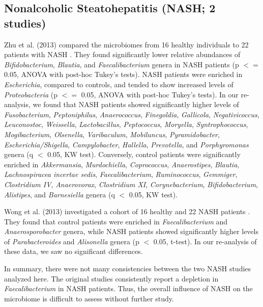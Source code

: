 {\subsection*{Nonalcoholic Steatohepatitis (NASH; 2 studies)}

Zhu et al. (2013) compared the microbiomes from 16 healthy individuals to 22 patients with NASH \cite{nash-baker}.
They found significantly lower relative abundances of \textit{Bifidobacterium}, \textit{Blautia}, and \textit{Faecalibacterium} genera in NASH patients (p $<=$ 0.05, ANOVA with post-hoc Tukey's tests).
NASH patients were enriched in \textit{Escherichia}, compared to controls, and tended to show increased levels of \textit{Proteobacteria} (p $<=$ 0.05, ANOVA with post-hoc Tukey's tests).
In our re-analysis, we found that NASH patients showed significantly higher levels of \textit{Fusobacterium}, \textit{Peptoniphilus}, \textit{Anaerococcus}, \textit{Finegoldia}, \textit{Gallicola}, \textit{Negativicoccus}, \textit{Leuconostoc}, \textit{Weissella}, \textit{Lactobacillus}, \textit{Peptococcus}, \textit{Moryella}, \textit{Syntrophococcus}, \textit{Mogibacterium}, \textit{Olsenella}, \textit{Varibaculum}, \textit{Mobiluncus}, \textit{Pyramidobacter}, \textit{Escherichia/Shigella}, \textit{Campylobacter}, \textit{Hallella}, \textit{Prevotella}, and \textit{Porphyromonas} genera (q $<$ 0.05, KW test).
Conversely, control patients were significantly enriched in \textit{Akkermansia}, \textit{Murdochiella}, \textit{Coprococcus}, \textit{Anaerostipes}, \textit{Blautia}, \textit{Lachnospiracea incertae sedis}, \textit{Faecalibacterium}, \textit{Ruminococcus}, \textit{Gemmiger}, \textit{Clostridium IV}, \textit{Anaerovorax}, \textit{Clostridium XI}, \textit{Corynebacterium}, \textit{Bifidobacterium}, \textit{Alistipes}, and \textit{Barnesiella} genera (q $<$ 0.05, KW test).

Wong et al. (2013) investigated a cohort of 16 healthy and 22 NASH patients \cite{nash-chan}.
They found that control patients were enriched in \textit{Faecalibacterium} and \textit{Anaerosporobacter} genera, while NASH patients showed significantly higher levels of \textit{Parabacteroides} and \textit{Alisonella} genera (p $<$ 0.05, t-test).
In our re-analysis of these data, we saw no significant differences.

In summary, there were not many consistencies between the two NASH studies analyzed here.
The original studies consistently report a depletion in \textit{Faecalibacterium} in NASH patients.
Thus, the overall influence of NASH on the microbiome is difficult to assess without further study.

}
